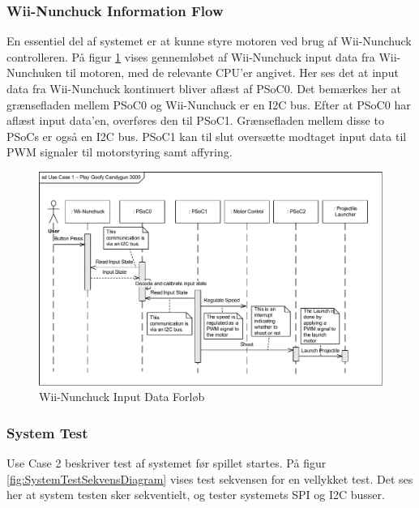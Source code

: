 \subsubsection{Wii-Nunchuck Information Flow}
En essentiel del af systemet er at kunne styre motoren ved brug af Wii-Nunchuck controlleren. På figur \ref{fig:WiiNunchuckSekvensDiagram} vises gennemløbet af Wii-Nunchuck input data fra Wii-Nunchuken til motoren, med de relevante CPU'er angivet. Her ses det at input data fra Wii-Nunchuck kontinuert bliver aflæst af PSoC0. Det bemærkes her at grænsefladen mellem PSoC0 og Wii-Nunchuck er en I2C bus. Efter at PSoC0 har aflæst input data'en, overføres den til PSoC1. Grænsefladen mellem disse to PSoCs er også en I2C bus. PSoC1 kan til slut oversætte modtaget input data til PWM signaler til motorstyring samt affyring.

\begin{figure}[H]
	\centering
	\includegraphics[width=\textwidth] {Systemarkitektur/images/SequenceDiagramUC1}
	\caption{Wii-Nunchuck Input Data Forløb}
	\label{fig:WiiNunchuckSekvensDiagram}
\end{figure}

\subsubsection{System Test}
Use Case 2 beskriver test af systemet før spillet startes. På figur \ref{fig:SystemTestSekvensDiagram} vises test sekvensen for en vellykket test. Det ses her at system testen sker sekventielt, og tester systemets SPI og I2C busser.

